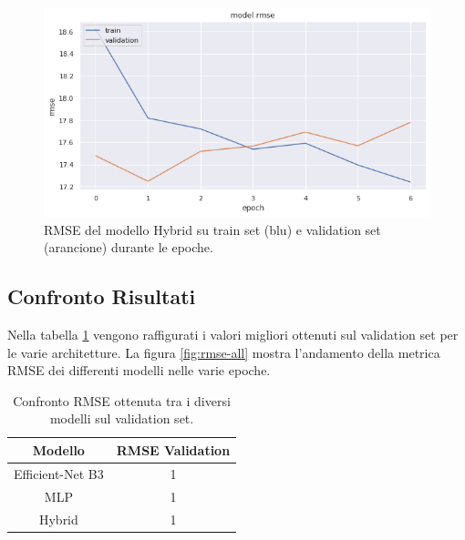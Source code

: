     \begin{figure}[h]
        \centering
        \includegraphics[scale=0.55]{Plot/FINAL_RMSE.png}
        \caption{RMSE del modello Hybrid su train set (blu) e validation set (arancione) durante le epoche.}
        \label{fig:rmse-final}
    \end{figure}
    
\newpage


\subsection{Confronto Risultati}


Nella tabella \ref{table:rmse} vengono raffigurati i valori migliori ottenuti sul validation set per le varie architetture. La figura \ref{fig:rmse-all} mostra l'andamento della metrica RMSE dei differenti modelli nelle varie epoche.

\vspace{1cm}

\begin{table}[h]
\caption{Confronto RMSE ottenuta tra i diversi modelli sul validation set.}
  \vspace{3mm}
\centering
\begin{tabular}{|c|c|}
\hline
\textbf{Modello}   & \textbf{RMSE Validation} \\ \hline \hline
Efficient-Net B3      & 1               \\ \hline
MLP       & 1               \\ \hline
Hybrid & 1               \\ \hline
\end{tabular}
\label{table:rmse}
\end{table}

\vspace{1cm}

